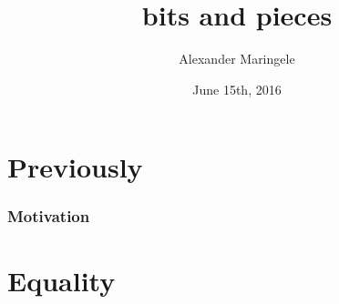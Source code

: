



\author{Alexander Maringele}
\title{bits and pieces\\
}
\date{June 15th, 2016}

%



 

\frame{\tableofcontents}

%

%





%

\section{Previously}

\begin{frame}
	\frametitle{Motivation}

\end{frame}




%
%
%
%
%
%
%
%
%
%
%

\section{Equality}
%


%	
%	
%	
%	
%	
%	
%	
%	
%		
%		
%		
 
